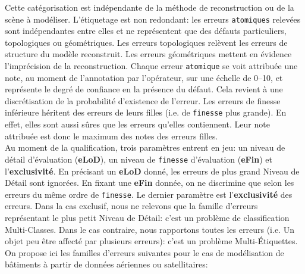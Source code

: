         Cette catégorisation est indépendante de la méthode de reconstruction ou de la scène à modéliser.
        L'étiquetage est non redondant: les erreurs \texttt{atomiques} relevées sont indépendantes entre elles et ne représentent que des défauts particuliers, topologiques ou géométriques.
        Les erreurs topologiques relèvent les erreurs de structure du modèle reconstruit.
        Les erreurs géométriques mettent en évidence l'imprécision de la reconstruction.
        Chaque erreur \texttt{atomique} se voit attribuée une note, au moment de l'annotation par l'opérateur, sur une échelle de \numrange[locale=FR]{0}{10}, et représente le degré de confiance en la présence du défaut.
        Cela revient à une discrétisation de la probabilité d'existence de l'erreur.
        Les erreurs de finesse inférieure héritent des erreurs de leurs filles (i.e. de \texttt{finesse} plus grande).
        En effet, elles sont aussi sûres que les erreurs qu'elles contiennent.
        Leur note attribuée est donc le maximum des notes des erreurs filles.\\

        Au moment de la qualification, trois paramètres entrent en jeu: un niveau de détail d'évaluation (\textbf{eLoD}), un niveau de \texttt{finesse} d'évaluation (\textbf{eFin}) et l'\textbf{exclusivité}.
        En précisant un \textbf{eLoD} donné, les erreurs de plus grand Niveau de Détail sont ignorées.
        En fixant une \textbf{eFin} donnée, on ne discrimine que selon les erreurs du même ordre de \texttt{finesse}.
        Le dernier paramètre est l'\textbf{exclusivité} des erreurs.
        Dans la cas exclusif, nous ne relevons que la famille d'erreurs représentant le plus petit Niveau de Détail: c'est un problème de classification Multi-Classes.
        Dans le cas contraire, nous rapportons toutes les erreurs (i.e. Un objet peu être affecté par plusieurs erreurs): c'est un problème Multi-\'Etiquettes.\\

        On propose ici les familles d'erreurs suivantes pour le cas de modélisation de bâtiments à partir de données aériennes ou satellitaires:

